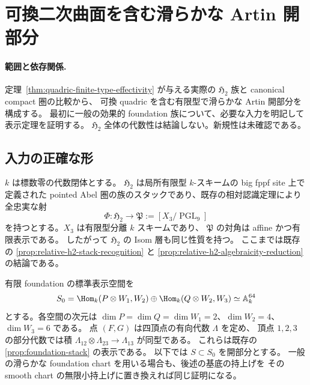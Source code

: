 \section{可換二次曲面を含む滑らかな Artin 開部分}
\label{sec:quadric-smooth-atlas}

\paragraph{範囲と依存関係.}
定理~\ref{thm:quadric-finite-type-effectivity} が与える実際の
$\mathfrak H_2$ 族と canonical compact 圏の比較から、
可換 quadric を含む有限型で滑らかな Artin 開部分を構成する。
最初に一般の効果的 foundation 族について、必要な入力を明記して表示定理を証明する。
$\mathfrak H_2$ 全体の代数性は結論しない。新規性は未確認である。

\subsection{入力の正確な形}

$k$ は標数零の代数閉体とする。
$\mathfrak H_2$ は局所有限型 $k$-スキームの big fppf site 上で定義された
pointed Abel 圏の族のスタックであり、既存の相対認識定理により
全忠実な射
\[
 \Phi:\mathfrak H_2\longrightarrow\mathfrak P
 :=[X_3/\operatorname{PGL}_9]
\]
を持つとする。$X_3$ は有限型分離 $k$ スキームであり、
$\mathfrak P$ の対角は affine かつ有限表示である。
したがって $\mathfrak H_2$ の Isom 層も同じ性質を持つ。
ここまでは既存の
\ref{prop:relative-h2-stack-recognition} と
\ref{prop:relative-h2-algebraicity-reduction} の結論である。

有限 foundation の標準表示空間を
\[
 S_0=\Hom_k(P\otimes W_1,W_2)
       \oplus\Hom_k(Q\otimes W_2,W_3)
       \simeq\mathbb A_k^{64}
\]
とする。各空間の次元は
$\dim P=\dim Q=\dim W_1=2$、$\dim W_2=4$、$\dim W_3=6$ である。
点 $(F,G)$ は四頂点の有向代数 $\Lambda$ を定め、
頂点 $1,2,3$ の部分代数では積
$\Lambda_{12}\otimes\Lambda_{23}\to\Lambda_{13}$ が同型である。
これらは既存の \ref{prop:foundation-stack} の表示である。
以下では $S\subset S_0$ を開部分とする。
一般の滑らかな foundation chart を用いる場合も、後述の基底の持上げを
その smooth chart の無限小持上げに置き換えれば同じ証明になる。

